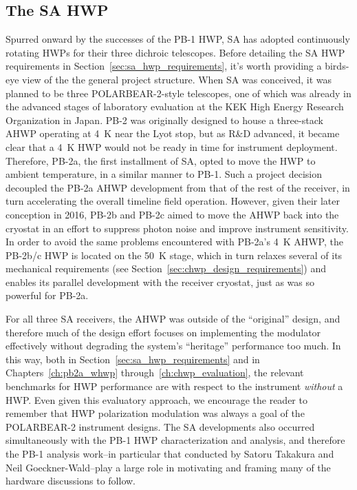 
\subsection{The SA HWP}
\label{sec:sa_hwp}

Spurred onward by the successes of the PB-1 HWP, SA has adopted continuously rotating HWPs for their three dichroic telescopes. Before detailing the SA HWP requirements in Section~\ref{sec:sa_hwp_requirements}, it's worth providing a birds-eye view of the the general project structure. When SA was conceived, it was planned to be three POLARBEAR-2-style telescopes, one of which was already in the advanced stages of laboratory evaluation at the KEK High Energy Research Organization in Japan. PB-2 was originally designed to house a three-stack AHWP operating at 4~K near the Lyot stop, but as R\&D advanced, it became clear that a 4~K HWP would not be ready in time for instrument deployment. Therefore, PB-2a, the first installment of SA, opted to move the HWP to ambient temperature, in a similar manner to PB-1. Such a project decision decoupled the PB-2a AHWP development from that of the rest of the receiver, in turn accelerating the overall timeline field operation. However, given their later conception in 2016, PB-2b and PB-2c aimed to move the AHWP back into the cryostat in an effort to suppress photon noise and improve instrument sensitivity. In order to avoid the same problems encountered with PB-2a's 4~K AHWP, the PB-2b/c HWP is located on the 50~K stage, which in turn relaxes several of its mechanical requirements (see Section~\ref{sec:chwp_design_requirements}) and enables its parallel development with the receiver cryostat, just as was so powerful for PB-2a. 

For all three SA receivers, the AHWP was outside of the ``original'' design, and therefore much of the design effort focuses on implementing the modulator effectively without degrading the system's ``heritage'' performance too much. In this way, both in Section~\ref{sec:sa_hwp_requirements} and in Chapters~\ref{ch:pb2a_whwp} through~\ref{ch:chwp_evaluation}, the relevant benchmarks for HWP performance are with respect to the instrument \textit{without} a HWP. Even given this evaluatory approach, we encourage the reader to remember that HWP polarization modulation was always a goal of the POLARBEAR-2 instrument designs. The SA developments also occurred simultaneously with the PB-1 HWP characterization and analysis, and therefore the PB-1 analysis work--in particular that conducted by Satoru Takakura and Neil Goeckner-Wald--play a large role in motivating and framing many of the hardware discussions to follow.

